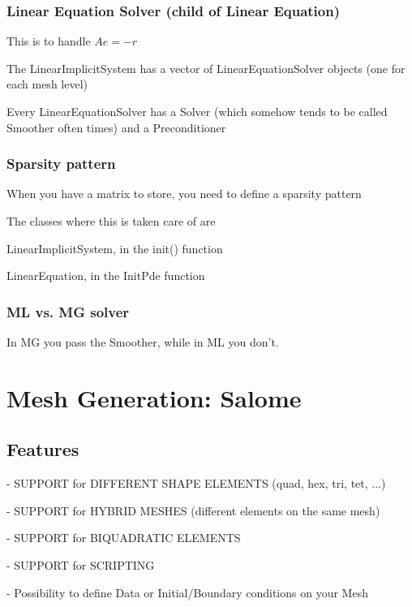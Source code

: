 \documentclass[10pt]{book}
\begin{document}
 \section{Linear Equation Solver (child of Linear Equation)}
 
 This is to handle $ A e = - r $
 
 The LinearImplicitSystem has a vector of LinearEquationSolver objects (one for each mesh level)
 
 Every LinearEquationSolver has a Solver (which somehow tends to be called Smoother often times) and a Preconditioner
 
 \section{Sparsity pattern}
 
  When you have a matrix to store, you need to define a sparsity pattern
  
  The classes where this is taken care of are 
  
  LinearImplicitSystem, in the init() function
  
  LinearEquation, in the InitPde function
  
  
 
  
 \section{ML vs. MG solver}

 In MG you pass the Smoother, while in ML you don't.
 
 
 
\part{Mesh Generation: Salome}


\chapter{Features}


 - {SUPPORT for DIFFERENT SHAPE ELEMENTS (quad, hex, tri, tet, ...)} 

 - {SUPPORT for HYBRID MESHES (different elements on the same mesh)}
    
 - {SUPPORT for BIQUADRATIC ELEMENTS}
    
 - {SUPPORT for SCRIPTING}
  
 - Possibility to define Data or Initial/Boundary conditions on your Mesh 
\end{document}

